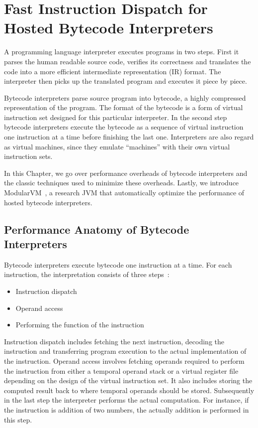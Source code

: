 \chapter{Fast Instruction Dispatch for Hosted Bytecode Interpreters}
\label{chp:ch2-bytecode}

A programming language interpreter executes programs in two steps.
First it parses the human readable source code, verifies its correctness and translates the code into a more efficient intermediate representation (IR) format.
The interpreter then picks up the translated program and executes it piece by piece.

Bytecode interpreters parse source program into bytecode, a highly compressed representation of the program.
The format of the bytecode is a form of virtual instruction set designed for this particular interpreter.
In the second step bytecode interpreters execute the bytecode as a sequence of virtual instruction one instruction at a time before finishing the last one.
Interpreters are also regard as virtual machines, since they emulate ``machines'' with their own virtual instruction sets.

In this Chapter, we go over performance overheads of bytecode interpreters and the classic techniques used to minimize these overheads.
Lastly, we introduce ModularVM~\cite{savrun2013, savrun2014}, a research JVM that automatically optimize the performance of hosted bytecode interpreters.

\section{Performance Anatomy of Bytecode Interpreters}

Bytecode interpreters execute bytecode one instruction at a time.
For each instruction, the interpretation consists of three steps~\cite{davis2003case}:
\begin{itemize}
  \item Instruction dispatch
  \item Operand access
  \item Performing the function of the instruction
\end{itemize}
Instruction dispatch includes fetching the next instruction, decoding the instruction and transferring program execution to the actual implementation of the instruction.
Operand access involves fetching operands required to perform the instruction from either a temporal operand stack or a virtual register file depending on the design of the virtual instruction set.
It also includes storing the computed result back to where temporal operands should be stored.
Subsequently in the last step the interpreter performs the actual computation.
For instance, if the instruction is addition of two numbers, the actually addition is performed in this step.

